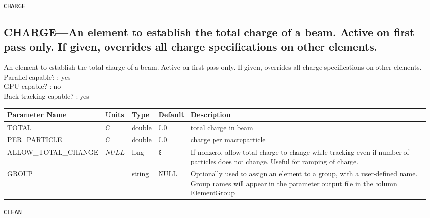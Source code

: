\newpage
\begin{center}{\Large\verb|CHARGE|}\end{center}
\subsection{CHARGE---An element to establish the total charge of a beam.  Active on first pass only.  If given, overrides all charge specifications on other elements.}
An element to establish the total charge of a beam.  Active on first pass only.  If given, overrides all charge specifications on other elements.
\\
Parallel capable? : yes\\
GPU capable? : no\\
Back-tracking capable? : yes\\
\begin{tabular}{|l|l|l|l|p{\descwidth}|} \hline
Parameter Name & Units & Type & Default & Description \\ \hline 
TOTAL & $C$ & double &  0.0 & total charge in beam  \\ \hline 
PER\_PARTICLE & $C$ & double &  0.0 & charge per macroparticle  \\ \hline 
ALLOW\_TOTAL\_CHANGE & $NULL$ & long &  \verb|0| & If nonzero, allow total charge to change while tracking even if number of particles does not change.  Useful for ramping of charge.  \\ \hline 
GROUP &  & string & NULL & Optionally used to assign an element to a group, with a user-defined name.  Group names will appear in the parameter output file in the column ElementGroup  \\ \hline 
\end{tabular}

\vspace*{0.5in}

\newpage
\begin{center}{\Large\verb|CLEAN|}\end{center}
